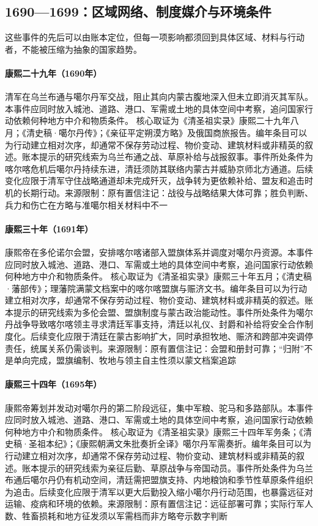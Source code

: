 \subsection{1690—1699：区域网络、制度媒介与环境条件}
这些事件的先后可以由账本定位，但每一项影响都须回到具体区域、材料与行动者，不能被压缩为抽象的国家趋势。
\hypertarget{civic:EQ-1690-ULAN-BUTUNG}{}\paragraph{康熙二十九年（1690年）}清军在乌兰布通与噶尔丹军交战，阻止其向内蒙古腹地深入但未立即消灭其军队。本事件应同时放入城池、道路、港口、军需或土地的具体空间中考察，追问国家行动依赖何种地方中介和物质条件。 核心取证为《清圣祖实录》康熙二十九年八月；《清史稿·噶尔丹传》；《亲征平定朔漠方略》及俄国商旅报告。编年条目可以为行动建立相对次序，却通常不保存劳动过程、物价变动、建筑材料或非精英的叙述。账本提示的研究线索为乌兰布通之战、草原补给与战报叙事。事件所处条件为喀尔喀危机后噶尔丹持续东进，清廷须防其联络内蒙古并威胁京师北方通道。后续变化应限于清军守住战略通道却未完成歼灭，战争转为更依赖补给、盟友和追击时机的长期行动。来源限制：原有置信注记：战役与战略结果大体可靠；胜负判断、兵力和伤亡在方略与准噶尔相关材料中不一
\hypertarget{civic:EQ-1691-DOLONNOR}{}\paragraph{康熙三十年（1691年）}康熙帝在多伦诺尔会盟，安排喀尔喀诸部入盟旗体系并调度对噶尔丹资源。本事件应同时放入城池、道路、港口、军需或土地的具体空间中考察，追问国家行动依赖何种地方中介和物质条件。 核心取证为《清圣祖实录》康熙三十年五月；《清史稿·藩部传》；理藩院满蒙文档案中的喀尔喀盟旗与赈济文书。编年条目可以为行动建立相对次序，却通常不保存劳动过程、物价变动、建筑材料或非精英的叙述。账本提示的研究线索为多伦会盟、盟旗制度与蒙古政治能动性。事件所处条件为噶尔丹战争导致喀尔喀领主寻求清廷军事支持，清廷以礼仪、封爵和补给将安全合作制度化。后续变化应限于清廷在蒙古影响扩大，同时承担牧地、赈济和跨部冲突调停责任，统属关系仍需谈判。来源限制：原有置信注记：会盟和册封可靠；“归附”不是单向完成，盟旗编制、牧地与领主自主性须以蒙文档案追踪
\hypertarget{civic:EQ-1695-GALDAN-CAMPAIGN}{}\paragraph{康熙三十四年（1695年）}康熙帝筹划并发动对噶尔丹的第二阶段远征，集中军粮、驼马和多路部队。本事件应同时放入城池、道路、港口、军需或土地的具体空间中考察，追问国家行动依赖何种地方中介和物质条件。 核心取证为《清圣祖实录》康熙三十四年军务条；《清史稿·圣祖本纪》；《康熙朝满文朱批奏折全译》噶尔丹军需奏折。编年条目可以为行动建立相对次序，却通常不保存劳动过程、物价变动、建筑材料或非精英的叙述。账本提示的研究线索为亲征后勤、草原战争与帝国动员。事件所处条件为乌兰布通后噶尔丹仍有机动空间，清廷需把盟旗支持、内地粮饷和季节性草原条件组织为追击。后续变化应限于清军以更大后勤投入缩小噶尔丹行动范围，也暴露远征对运输、疫病和环境的依赖。来源限制：原有置信注记：远征部署可靠；实际行军人数、牲畜损耗和地方征发须以军需档而非方略夸示数字判断
